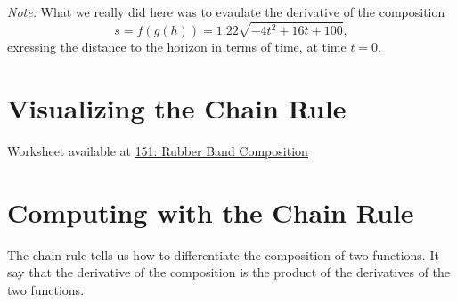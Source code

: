 \documentclass{ximera}
\begin{document}
\begin{example}
\begin{explanation}
\emph{Note:} What we really did here was to evaulate the derivative of the composition
\[
      s = f(g(h)) = 1.22\sqrt{-4t^2 + 16t + 100},
\]
exressing the distance to the horizon in terms of time, at time $t=0$.
\end{explanation}



\end{example}






\section{Visualizing the Chain Rule}

\begin{onlineOnly}
    \begin{center}
\end{center}
\end{onlineOnly}

Worksheet available at \href{https://www.desmos.com/calculator/8whlpa61hn}{151: Rubber Band Composition}



 

\section{Computing with the Chain Rule}

The chain rule tells us how to differentiate the composition of two functions. It say that the derivative of the composition is the product of the derivatives of the two functions.
\end{document}
